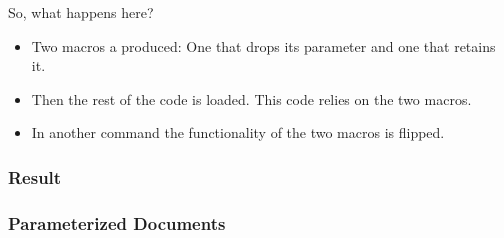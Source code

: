 {\begin{frame}[fragile]
  \pause
  \vspace{5mm}
  So, what happens here?
  \pause
  \begin{itemize}
    \item Two macros a produced: One that drops its parameter and one that retains it.
    \item Then the rest of the code is loaded. This code relies on the two macros.
    \item In another command the functionality of the two macros is flipped.
  \end{itemize}
\end{frame}

\subsubsection{Result}
\begin{frame}[fragile]
  \frametitle{Parameterized Documents }
\end{frame}

}
